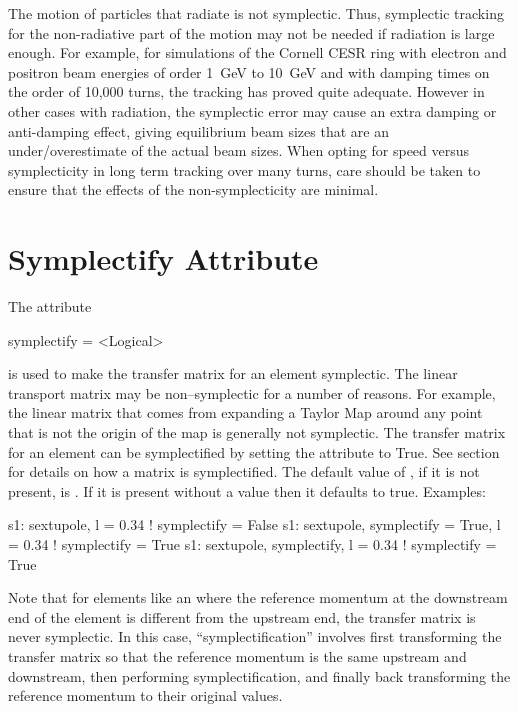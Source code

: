 The motion of particles that radiate is not symplectic. Thus, symplectic tracking for the
non-radiative part of the motion may not be needed if radiation is large enough. For example, for
simulations of the Cornell CESR ring with electron and positron beam energies of order 1~GeV to
10~GeV and with damping times on the order of 10,000 turns, the  tracking has
proved quite adequate. However in other cases with radiation, the symplectic error may cause an 
extra damping or anti-damping effect, giving equilibrium beam sizes that are an under/overestimate 
of the actual beam sizes. When opting for speed versus symplecticity in long term tracking over 
many turns, care should be taken to ensure that the effects of the non-symplecticity are minimal.

\section{Symplectify Attribute}
\label{s:symp}

The  attribute
\begin{example}
  symplectify = <Logical>
\end{example}
is used to make the transfer matrix for an element symplectic. The linear transport matrix may be
non--symplectic for a number of reasons.  For example, the linear matrix that comes from expanding a
Taylor Map around any point that is not the origin of the map is generally not symplectic. The
transfer matrix for an element can be symplectified by setting the  attribute to
True. See section~ for details on how a matrix is symplectified. The default
value of , if it is not present, is . If it is present without a value
then it defaults to true. Examples:
\begin{example}
  s1: sextupole, l = 0.34                       ! symplectify = False
  s1: sextupole, symplectify = True, l = 0.34   ! symplectify = True
  s1: sextupole, symplectify, l = 0.34          ! symplectify = True
\end{example}

\label{lcavity} Note that for elements like an  where the
reference momentum at the downstream end of the element is different
from the upstream end, the transfer matrix is never symplectic. In
this case, ``symplectification'' involves first transforming the
transfer matrix so that the reference momentum is the same upstream
and downstream, then performing symplectification, and finally back
transforming the reference momentum to their original values.


